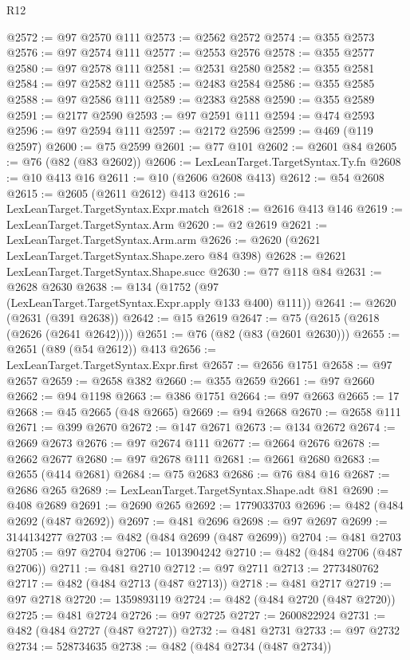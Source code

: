 \begin{lexlean}{R12}
\begin{coremodule}
@2572 := @97 @2570 @111
@2573 := @2562 @2572
@2574 := @355 @2573
@2576 := @97 @2574 @111
@2577 := @2553 @2576
@2578 := @355 @2577
@2580 := @97 @2578 @111
@2581 := @2531 @2580
@2582 := @355 @2581
@2584 := @97 @2582 @111
@2585 := @2483 @2584
@2586 := @355 @2585
@2588 := @97 @2586 @111
@2589 := @2383 @2588
@2590 := @355 @2589
@2591 := @2177 @2590
@2593 := @97 @2591 @111
@2594 := @474 @2593
@2596 := @97 @2594 @111
@2597 := @2172 @2596
@2599 := @469 (@119 @2597)
@2600 := @75 @2599
@2601 := @77 @101
@2602 := @2601 @84
@2605 := @76 (@82 (@83 @2602))
@2606 := LexLeanTarget.TargetSyntax.Ty.fn
@2608 := @10 @413 @16
@2611 := @10 (@2606 @2608 @413)
@2612 := @54 @2608
@2615 := @2605 (@2611 @2612) @413
@2616 := LexLeanTarget.TargetSyntax.Expr.match
@2618 := @2616 @413 @146
@2619 := LexLeanTarget.TargetSyntax.Arm
@2620 := @2 @2619
@2621 := LexLeanTarget.TargetSyntax.Arm.arm
@2626 := @2620 (@2621 LexLeanTarget.TargetSyntax.Shape.zero @84 @398)
@2628 := @2621 LexLeanTarget.TargetSyntax.Shape.succ
@2630 := @77 @118 @84
@2631 := @2628 @2630
@2638 := @134 (@1752 (@97 (LexLeanTarget.TargetSyntax.Expr.apply @133 @400) @111))
@2641 := @2620 (@2631 (@391 @2638))
@2642 := @15 @2619
@2647 := @75 (@2615 (@2618 (@2626 (@2641 @2642))))
@2651 := @76 (@82 (@83 (@2601 @2630)))
@2655 := @2651 (@89 (@54 @2612)) @413
@2656 := LexLeanTarget.TargetSyntax.Expr.first
@2657 := @2656 @1751
@2658 := @97 @2657
@2659 := @2658 @382
@2660 := @355 @2659
@2661 := @97 @2660
@2662 := @94 @1198
@2663 := @386 @1751
@2664 := @97 @2663
@2665 := 17
@2668 := @45 @2665 (@48 @2665)
@2669 := @94 @2668
@2670 := @2658 @111
@2671 := @399 @2670
@2672 := @147 @2671
@2673 := @134 @2672
@2674 := @2669 @2673
@2676 := @97 @2674 @111
@2677 := @2664 @2676
@2678 := @2662 @2677
@2680 := @97 @2678 @111
@2681 := @2661 @2680
@2683 := @2655 (@414 @2681)
@2684 := @75 @2683
@2686 := @76 @84 @16
@2687 := @2686 @265
@2689 := LexLeanTarget.TargetSyntax.Shape.adt @81
@2690 := @408 @2689
@2691 := @2690 @265
@2692 := 1779033703
@2696 := @482 (@484 @2692 (@487 @2692))
@2697 := @481 @2696
@2698 := @97 @2697
@2699 := 3144134277
@2703 := @482 (@484 @2699 (@487 @2699))
@2704 := @481 @2703
@2705 := @97 @2704
@2706 := 1013904242
@2710 := @482 (@484 @2706 (@487 @2706))
@2711 := @481 @2710
@2712 := @97 @2711
@2713 := 2773480762
@2717 := @482 (@484 @2713 (@487 @2713))
@2718 := @481 @2717
@2719 := @97 @2718
@2720 := 1359893119
@2724 := @482 (@484 @2720 (@487 @2720))
@2725 := @481 @2724
@2726 := @97 @2725
@2727 := 2600822924
@2731 := @482 (@484 @2727 (@487 @2727))
@2732 := @481 @2731
@2733 := @97 @2732
@2734 := 528734635
@2738 := @482 (@484 @2734 (@487 @2734))

\end{coremodule}
\end{lexlean}
